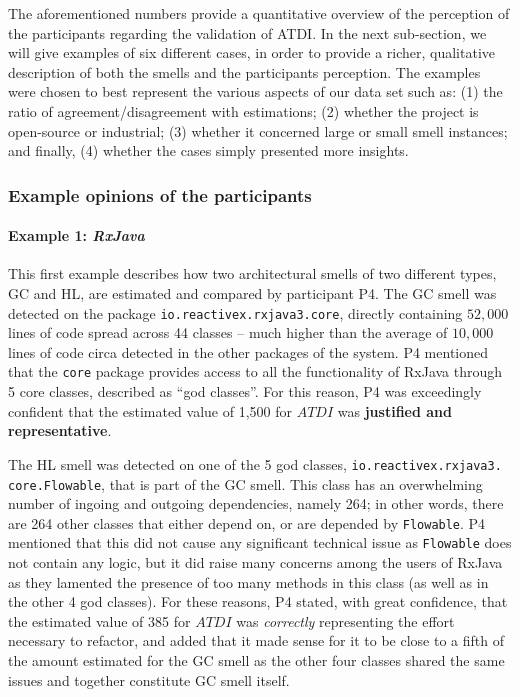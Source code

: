 The aforementioned numbers provide a quantitative overview of the perception of the participants regarding the validation of ATDI.
In the next sub-section, we will give examples of six different cases, in order to provide a richer, qualitative description of both the smells and the participants perception.  
The examples were chosen to best represent the various aspects of our data set such as: (1) the ratio of agreement/disagreement with estimations; (2) whether the project is open-source or industrial; (3) whether it concerned large or small smell instances; and finally, (4) whether the  cases simply presented more insights.

\subsubsection{Example opinions of the participants}\label{c6:sec:examples}
\paragraph{Example 1: \emph{RxJava}} This first example describes how two architectural smells of two different types, GC and HL, are estimated and compared by participant P4.
The GC smell was detected on the package \texttt{io.reactivex.rxjava3.core}, directly containing $52,000$ lines of code spread across 44 classes -- much higher than the average of $10,000$ lines of code circa detected in the other packages of the system.
P4 mentioned that the \texttt{core} package provides access to all the functionality of RxJava through 5 core classes, described as ``god classes''.
For this reason, P4 was exceedingly confident that the estimated value of 1,500 for $ATDI$ was \textbf{justified and representative}.

The HL smell was detected on one of the 5 god classes, \texttt{io.reactivex.rxjava3. core.Flowable}, that is part of the GC smell.
This class has an overwhelming number of ingoing and outgoing dependencies, namely 264; in other words, there are 264 other classes that either depend on, or are depended by \texttt{Flowable}.
P4 mentioned that this did not cause any significant technical issue as \texttt{Flowable} does not contain any logic, but it did raise many concerns among the users of RxJava as they lamented the presence of too many methods in this class (as well as in the other 4 god classes).
For these reasons, P4 stated, with great confidence, that the estimated value of 385 for $ATDI$ was \emph{correctly} representing the effort necessary to refactor, and added that it made sense for it to be close to a fifth of the amount estimated for the GC smell as the other four classes shared the same issues and together constitute GC smell itself.

